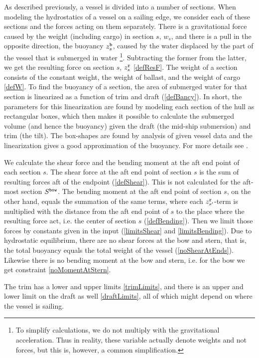 As described previously, a vessel is divided into a number of sections. When modeling the hydrostatics of a vessel on a sailing edge, we consider each of these sections and the forces acting on them separately. There is a gravitational force caused by the weight (including cargo) in section $s$, $w_{s}$, and there is a pull in the opposite direction, the buoyancy $z^\texttt{b}_{s}$, caused by the water displaced by the part of the vessel that is submerged in water \footnote{To simplify calculations, we do not multiply with the gravitational acceleration. Thus in reality, these variable actually denote weights and not forces, but this is, however, a common simplification.}. Subtracting the former from the latter, we get the resulting force on section $s$, $z^\texttt{r}_{s}$ \eqref{defResF}. 
The weight of a section consists of the constant weight, the weight of ballast, and the weight of cargo \eqref{defW}.
To find the buoyancy of a section, the area of submerged water for that section is linearized as a function of trim and draft (\ref{defBancy}). 
In short, the parameters for this linearization are found by modeling each section of the hull as rectangular boxes, which then makes it possible to calculate the submerged volume (and hence the buoyancy) given the draft (the mid-ship submersion) and trim (the tilt). The box-shapes are found by analysis of given vessel data and the linearization gives a good approximation of the buoyancy. For more details see \cite{iccl18}. 

We calculate the shear force and the bending moment at the aft end point of each section $s$. The shear force at the aft end point of section $s$ is the sum of resulting forces aft of the endpoint (\ref{defShear}). This is not calculated for the aft-most section $S^\texttt{bow}$. The bending moment at the aft end point of section $s$, on the other hand, equals the summation of the same terms, where each $z^\texttt{r}_{s'}$-term is multiplied with the distance from the aft end point of $s$ to the place where the resulting force act, i.e. the center of section $s$ (\ref{defBending}). Then we limit those forces by constants given in the input (\eqref{limitsShear} and \eqref{limitsBending}).
Due to hydrostatic equilibrium, there are no shear forces at the bow and stern, that is, the total buoyancy equals the total weight of the vessel (\ref{noShearAtEnds}).
Likewise there is no bending moment at the bow and stern, i.e. for the bow we get constraint \eqref{noMomentAtStern}.
					
The trim has a lower and upper limits \eqref{trimLimits}, and there is an upper and lower limit on the draft as well \eqref{draftLimits}, all of which might depend on where the vessel is sailing.
 
